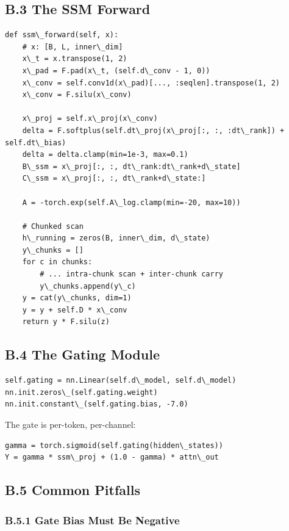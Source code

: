 \subsection{B.3 The SSM Forward}

\begin{lstlisting}
def ssm\_forward(self, x):
    # x: [B, L, inner\_dim]
    x\_t = x.transpose(1, 2)
    x\_pad = F.pad(x\_t, (self.d\_conv - 1, 0))
    x\_conv = self.conv1d(x\_pad)[..., :seqlen].transpose(1, 2)
    x\_conv = F.silu(x\_conv)
    
    x\_proj = self.x\_proj(x\_conv)
    delta = F.softplus(self.dt\_proj(x\_proj[:, :, :dt\_rank]) + self.dt\_bias)
    delta = delta.clamp(min=1e-3, max=0.1)
    B\_ssm = x\_proj[:, :, dt\_rank:dt\_rank+d\_state]
    C\_ssm = x\_proj[:, :, dt\_rank+d\_state:]
    
    A = -torch.exp(self.A\_log.clamp(min=-20, max=10))
    
    # Chunked scan
    h\_running = zeros(B, inner\_dim, d\_state)
    y\_chunks = []
    for c in chunks:
        # ... intra-chunk scan + inter-chunk carry
        y\_chunks.append(y\_c)
    y = cat(y\_chunks, dim=1)
    y = y + self.D * x\_conv
    return y * F.silu(z)
\end{lstlisting}

\subsection{B.4 The Gating Module}

\begin{lstlisting}
self.gating = nn.Linear(self.d\_model, self.d\_model)
nn.init.zeros\_(self.gating.weight)
nn.init.constant\_(self.gating.bias, -7.0)
\end{lstlisting}

The gate is per-token, per-channel:
\begin{lstlisting}
gamma = torch.sigmoid(self.gating(hidden\_states))
Y = gamma * ssm\_proj + (1.0 - gamma) * attn\_out
\end{lstlisting}

\subsection{B.5 Common Pitfalls}

\subsubsection{B.5.1 Gate Bias Must Be Negative}

